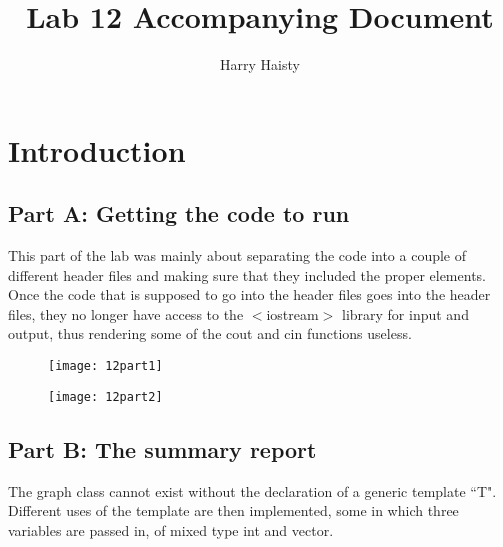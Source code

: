 \documentclass{article}
\title{Lab 12 Accompanying Document}
\author{Harry Haisty}
\date{}
\begin{document}
\maketitle

\section*{Introduction}

\subsection*{Part A: Getting the code to run}

This part of the lab was mainly about separating the code into a couple of different header files and making sure that they included the proper elements. Once the code that is supposed to go into the header files goes into the header files, they no longer have access to the  $<$iostream$>$ library for input and output, thus rendering some of the cout and cin functions useless.

\begin{figure}[h]
    \centering
    \texttt{[image: 12part1]}
    \label{fig:my_label}
\end{figure}

\begin{figure}[h]
    \centering
    \texttt{[image: 12part2]}
    \label{fig:my_label}
\end{figure}

\subsection*{Part B: The summary report}

The graph class cannot exist without the declaration of a generic template ``T". Different uses of the template are then implemented, some in which three variables are passed in, of mixed type int and vector. 
\end{document}
